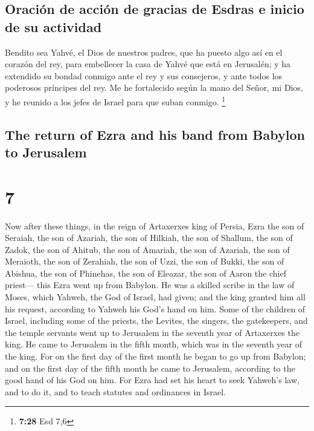 \begin{paracol}{2}
\hypertarget{oraciuxf3n-de-acciuxf3n-de-gracias-de-esdras-e-inicio-de-su-actividad}{%
\subsection{Oración de acción de gracias de Esdras e inicio de su
actividad}\label{oraciuxf3n-de-acciuxf3n-de-gracias-de-esdras-e-inicio-de-su-actividad}}

 Bendito sea Yahvé, el Dios de nuestros padres, que ha
puesto algo así en el corazón del rey, para embellecer la casa de Yahvé
que está en Jerusalén;  y ha extendido su bondad conmigo
ante el rey y sus consejeros, y ante todos los poderosos príncipes del
rey. Me he fortalecido según la mano del Señor, mi Dios, y he reunido a
los jefes de Israel para que suban conmigo. \footnote{\textbf{7:28} Esd
  7,6}

\switchcolumn
\begin{otherlanguage}{english}

\hypertarget{the-return-of-ezra-and-his-band-from-babylon-to-jerusalem}{%
\subsection{The return of Ezra and his band from Babylon to
Jerusalem}\label{the-return-of-ezra-and-his-band-from-babylon-to-jerusalem}}

\hypertarget{section-13}{%
\section{7}\label{section-13}}

 Now after these things, in the reign of Artaxerxes king
of Persia, Ezra the son of Seraiah, the son of Azariah, the son of
Hilkiah,  the son of Shallum, the son of Zadok, the son of
Ahitub,  the son of Amariah, the son of Azariah, the son
of Meraioth,  the son of Zerahiah, the son of Uzzi, the
son of Bukki,  the son of Abishua, the son of Phinehas,
the son of Eleazar, the son of Aaron the chief priest--- 
this Ezra went up from Babylon. He was a skilled scribe in the law of
Moses, which Yahweh, the God of Israel, had given; and the king granted
him all his request, according to Yahweh his God's hand on him.
 Some of the children of Israel, including some of the
priests, the Levites, the singers, the gatekeepers, and the temple
servants went up to Jerusalem in the seventh year of Artaxerxes the
king.  He came to Jerusalem in the fifth month, which was
in the seventh year of the king.  For on the first day of
the first month he began to go up from Babylon; and on the first day of
the fifth month he came to Jerusalem, according to the good hand of his
God on him.  For Ezra had set his heart to seek Yahweh's
law, and to do it, and to teach statutes and ordinances in Israel.


\end{otherlanguage}
\end{paracol}
